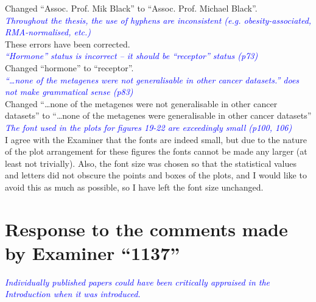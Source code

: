 \documentclass[a4paper, 12pt]{article}
\begin{document}
\noindent
Changed ``Assoc. Prof. Mik Black'' to ``Assoc. Prof. Michael Black''.
\\

\noindent
\textcolor{blue}{
\textit{Throughout the thesis, the use of hyphens are inconsistent (e.g. obesity-associated, RMA-normalised, etc.)
}
}\\

\noindent
These errors have been corrected.
\\

\noindent
\textcolor{blue}{
\textit{``Hormone'' status is incorrect -- it should be ``receptor'' status (p73)
}
}\\

\noindent
Changed ``hormone'' to ``receptor''.
\\

\noindent
\textcolor{blue}{
\textit{``\ldots none of the metagenes were not generalisable in other cancer datasets.'' does not make grammatical sense (p83)
}
}\\

\noindent
Changed ``\ldots none of the metagenes were not generalisable in other cancer datasets'' to ``\ldots none of the metagenes were generalisable in other cancer datasets''
\\

\noindent
\textcolor{blue}{
\textit{The font used in the plots for figures 19-22 are exceedingly small (p100, 106)
}
}\\

\noindent
I agree with the Examiner that the fonts are indeed small, but due to the nature of the plot arrangement for these figures the fonts cannot be made any larger (at least not trivially).
Also, the font size was chosen so that the statistical values and letters did not obscure the points and boxes of the plots, and I would like to avoid this as much as possible, so I have left the font size unchanged.
\\

\newpage

\section*{Response to the comments made by Examiner ``1137''}
\label{sec:response_to_comments_from_examiner_1137}

\noindent
\textcolor{blue}{
	\textit{Individually published papers could have been critically appraised in the Introduction when it was introduced.
	}
}\\
\end{document}
